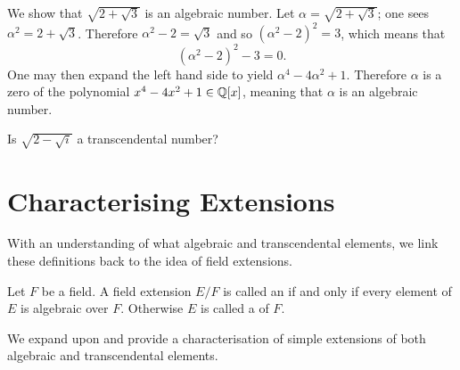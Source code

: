 \begin{example}
    We show that $\sqrt{2+\sqrt3}$ is an algebraic number. Let $\alpha = \sqrt{2+\sqrt3}$; one sees $\alpha^2 = 2 + \sqrt3$. Therefore $\alpha^2 - 2 = \sqrt3$ and so $(\alpha^2 - 2)^2 = 3$, which means that
    \[
        (\alpha^2 - 2)^2 - 3 = 0.
    \]
    One may then expand the left hand side to yield $\alpha^4 - 4\alpha^2 + 1$. Therefore $\alpha$ is a zero of the polynomial $x^4 - 4x^2 + 1 \in \mathbb{Q}[x]$, meaning that $\alpha$ is an algebraic number.
\end{example}

\begin{exercise}
    Is $\sqrt{2 - \sqrt{i}}$ a transcendental number?
\end{exercise}

\newpage

\section{Characterising Extensions}
With an understanding of what algebraic and transcendental elements, we link these definitions back to the idea of field extensions.

\begin{definition}
    Let $F$ be a field. A field extension $E/F$ is called an  if and only if every element of $E$ is algebraic over $F$. Otherwise $E$ is called a  of $F$.
\end{definition}

We expand upon  and provide a characterisation of simple extensions of both algebraic and transcendental elements.

